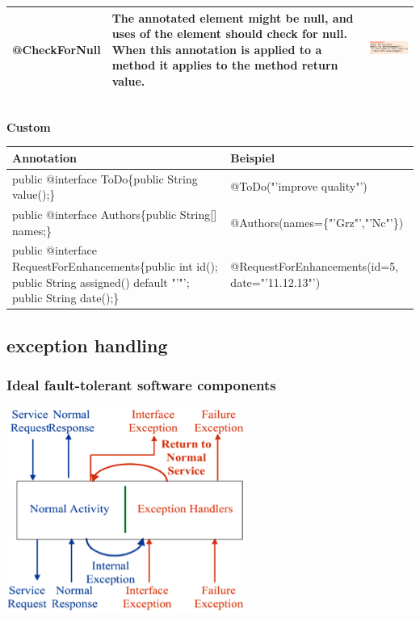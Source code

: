 \documentclass[10pt]{article}
\begin{document}
\begin{tabular}{| l | p{8cm} | m{6cm} |}
@CheckForNull & The annotated element might be null, and uses of the element should check for null. When this annotation is applied to a method it applies to the method return value. & \includegraphics[width=6cm]{annotation_checkfornull.PNG} \\ \hline
\end{tabular}\\

\textbf{Custom}\\
\begin{tabular}{| p{9.5cm} | p{8cm} |}
\hline
Annotation & Beispiel \\ \hline
public @interface ToDo\{public String value();\} & @ToDo("'improve quality"') \\ \hline
public @interface Authors\{public String[] names;\} & @Authors(names=\{"'Grz"',"'Nc"'\}) \\ \hline
public @interface RequestForEnhancements\{\newline public int id(); public String assigned() default "'"'; public String date();\} & @RequestForEnhancements(id=5, date="'11.12.13"') \\ \hline
\end{tabular}

\subsection{exception handling}
\subsubsection{Ideal fault-tolerant software components}
\begin{center}
	\includegraphics[scale=0.6]{fault_tolerant.png}
\end{center}
\end{document}
